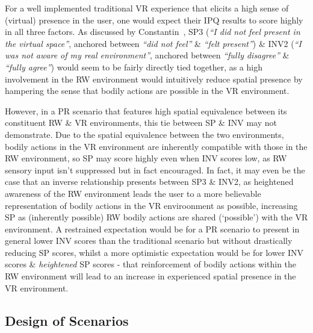 For a well implemented traditional VR experience that elicits a high sense of (virtual) presence in the user, one would expect their IPQ results to score highly in all three factors. As discussed by Constantin~\cite{Constantin2003a}, SP3 (\textit{``I did not feel present in the virtual space''}, anchored between \textit{``did not feel''} \& \textit{``felt present''}) \& INV2 (\textit{``I was not aware of my real environment''}, anchored between \textit{``fully disagree''} \& \textit{``fully agree''}) would seem to be fairly directly tied together, as a high involvement in the RW environment would intuitively reduce spatial presence by hampering the sense that bodily actions are possible in the VR environment.

However, in a PR scenario that features high spatial equivalence between its constituent RW \& VR environments, this tie between SP \& INV may not demonstrate. Due to the spatial equivalence between the two environments, bodily actions in the VR environment are inherently compatible with those in the RW environment, so SP may score highly even when INV scores low, as RW sensory input isn't suppressed but in fact encouraged. In fact, it may even be the case that an inverse relationship presents between SP3 \& INV2, as heightened awareness of the RW environment leads the user to a more believable representation of bodily actions in the VR enviroonment as possible, increasing SP as (inherently possible) RW bodily actions are shared (`possible') with the VR environment. A restrained expectation would be for a PR scenario to present in general lower INV scores than the traditional scenario but without drastically reducing SP scores, whilst a more optimistic expectation would be for lower INV scores \& \textit{heightened} SP scores - that reinforcement of bodily actions within the RW environment will lead to an increase in experienced spatial presence in the VR environment.





\subsection{Design of Scenarios}

